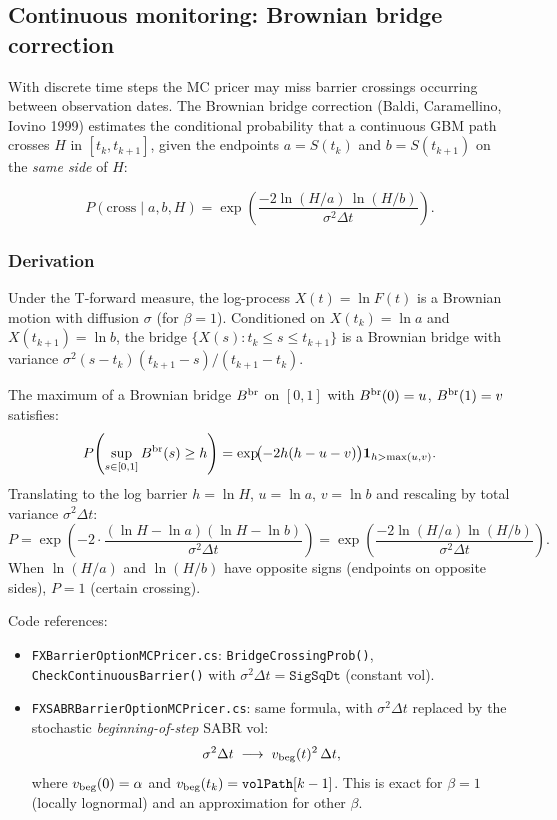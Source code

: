 \documentclass[11pt,a4paper]{article}
\newcommand{\coderef}[1]{\texttt{\color{blue!60!black}#1}}
\theoremstyle{definition}
\begin{document}
\subsection{Continuous monitoring: Brownian bridge correction}

With discrete time steps the MC pricer may miss barrier crossings occurring
between observation dates.  The Brownian bridge correction (Baldi,
Caramellino, Iovino 1999) estimates the conditional probability that a
continuous GBM path crosses $H$ in $[t_k,t_{k+1}]$, given the endpoints
$a=S(t_k)$ and $b=S(t_{k+1})$ on the \emph{same side} of $H$:

\[
  \boxed{P(\text{cross}\mid a,b,H)
  = \exp\!\left(\frac{-2\ln(H/a)\,\ln(H/b)}{\sigma^2\Delta t}\right).}
\]

\subsubsection{Derivation}

Under the T-forward measure, the log-process $X(t)=\ln F(t)$ is a Brownian
motion with diffusion $\sigma$ (for $\beta=1$).  Conditioned on
$X(t_k)=\ln a$ and $X(t_{k+1})=\ln b$, the bridge $\{X(s):t_k\le s\le t_{k+1}\}$
is a Brownian bridge with variance $\sigma^2(s-t_k)(t_{k+1}-s)/(t_{k+1}-t_k)$.

The maximum of a Brownian bridge $B^{\rm br}$ on $[0,1]$ with $B^{\rm br}(0)=u$,
$B^{\rm br}(1)=v$ satisfies:
\[
  P\!\left(\sup_{s\in[0,1]}B^{\rm br}(s)\geq h\right)
  = \exp\!\bigl(-2h(h-u-v)\bigr)\mathbf{1}_{h>\max(u,v)}.
\]
Translating to the log barrier $h=\ln H$, $u=\ln a$, $v=\ln b$ and
rescaling by total variance $\sigma^2\Delta t$:
\[
  P = \exp\!\left(-2\cdot\frac{(\ln H-\ln a)(\ln H-\ln b)}{\sigma^2\Delta t}\right)
    = \exp\!\left(\frac{-2\ln(H/a)\ln(H/b)}{\sigma^2\Delta t}\right).
\]
When $\ln(H/a)$ and $\ln(H/b)$ have opposite signs (endpoints on opposite
sides), $P=1$ (certain crossing).

Code references:
\begin{itemize}[nosep]
  \item \coderef{FXBarrierOptionMCPricer.cs}: \texttt{BridgeCrossingProb()},
    \texttt{CheckContinuousBarrier()} with $\sigma^2\Delta t=\texttt{SigSqDt}$ (constant vol).
  \item \coderef{FXSABRBarrierOptionMCPricer.cs}: same formula, with
    $\sigma^2\Delta t$ replaced by the stochastic \emph{beginning-of-step} SABR vol:
    \[ \sigma^2\Delta t \;\longrightarrow\; v_{\rm beg}(t)^2\,\Delta t, \]
    where $v_{\rm beg}(0)=\alpha$ and $v_{\rm beg}(t_k)=\texttt{volPath}[k-1]$.
    This is exact for $\beta=1$ (locally lognormal) and an approximation for other $\beta$.
\end{itemize}
\end{document}

